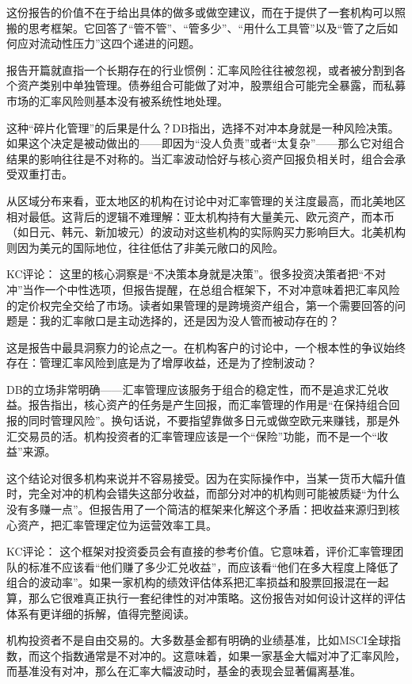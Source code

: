 \documentclass[11pt]{ctexart}
\begin{document}
这份报告的价值不在于给出具体的做多或做空建议，而在于提供了一套机构可以照搬的思考框架。它回答了“管不管”、“管多少”、“用什么工具管”以及“管了之后如何应对流动性压力”这四个递进的问题。

报告开篇就直指一个长期存在的行业惯例：汇率风险往往被忽视，或者被分割到各个资产类别中单独管理。债券组合可能做了对冲，股票组合可能完全暴露，而私募市场的汇率风险则基本没有被系统性地处理。

这种“碎片化管理”的后果是什么？DB指出，选择不对冲本身就是一种风险决策。如果这个决定是被动做出的——即因为“没人负责”或者“太复杂”——那么它对组合结果的影响往往是不对称的。当汇率波动恰好与核心资产回报负相关时，组合会承受双重打击。

从区域分布来看，亚太地区的机构在讨论中对汇率管理的关注度最高，而北美地区相对最低。这背后的逻辑不难理解：亚太机构持有大量美元、欧元资产，而本币（如日元、韩元、新加坡元）的波动对这些机构的实际购买力影响巨大。北美机构则因为美元的国际地位，往往低估了非美元敞口的风险。

KC评论： 这里的核心洞察是“不决策本身就是决策”。很多投资决策者把“不对冲”当作一个中性选项，但报告提醒，在总组合框架下，不对冲意味着把汇率风险的定价权完全交给了市场。读者如果管理的是跨境资产组合，第一个需要回答的问题是：我的汇率敞口是主动选择的，还是因为没人管而被动存在的？

这是报告中最具洞察力的论点之一。在机构客户的讨论中，一个根本性的争议始终存在：管理汇率风险到底是为了增厚收益，还是为了控制波动？

DB的立场非常明确——汇率管理应该服务于组合的稳定性，而不是追求汇兑收益。报告指出，核心资产的任务是产生回报，而汇率管理的作用是“在保持组合回报的同时管理风险”。换句话说，不要指望靠做多日元或做空欧元来赚钱，那是外汇交易员的活。机构投资者的汇率管理应该是一个“保险”功能，而不是一个“收益”来源。

这个结论对很多机构来说并不容易接受。因为在实际操作中，当某一货币大幅升值时，完全对冲的机构会错失这部分收益，而部分对冲的机构则可能被质疑“为什么没有多赚一点”。但报告用了一个简洁的框架来化解这个矛盾：把收益来源归到核心资产，把汇率管理定位为运营效率工具。

KC评论： 这个框架对投资委员会有直接的参考价值。它意味着，评价汇率管理团队的标准不应该看“他们赚了多少汇兑收益”，而应该看“他们在多大程度上降低了组合的波动率”。如果一家机构的绩效评估体系把汇率损益和股票回报混在一起算，那么它很难真正执行一套纪律性的对冲策略。这份报告对如何设计这样的评估体系有更详细的拆解，值得完整阅读。

机构投资者不是自由交易的。大多数基金都有明确的业绩基准，比如MSCI全球指数，而这个指数通常是不对冲的。这意味着，如果一家基金大幅对冲了汇率风险，而基准没有对冲，那么在汇率大幅波动时，基金的表现会显著偏离基准。
\end{document}
